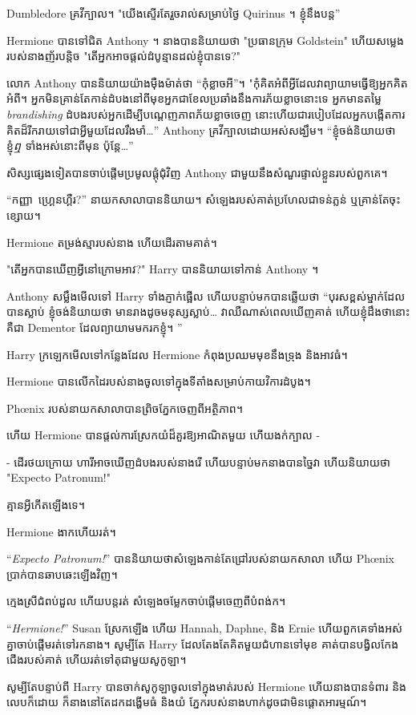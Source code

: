 Dumbledore គ្រវីក្បាល។ "យើងស្ទើរតែរួចរាល់សម្រាប់ថ្ងៃ Quirinus ។ ខ្ញុំនឹងបន្ត”

Hermione បានទៅជិត Anthony ។ នាងបាននិយាយថា "ប្រធានក្រុម Goldstein" ហើយសម្លេងរបស់នាងញ័របន្តិច "តើអ្នកអាចផ្តល់ដំបូន្មានដល់ខ្ញុំបានទេ?"

លោក Anthony បាននិយាយយ៉ាងម៉ឺងម៉ាត់ថា “កុំខ្លាចអី”។ "កុំគិតអំពីអ្វីដែលវាព្យាយាមធ្វើឱ្យអ្នកគិតអំពី។ អ្នកមិនគ្រាន់តែកាន់ដំបងនៅពីមុខអ្នកជាខែលប្រឆាំងនឹងការភ័យខ្លាចនោះទេ អ្នកមានតម្លៃ \emph{brandishing} ដំបងរបស់អ្នកដើម្បីបណ្តេញភាពភ័យខ្លាចចេញ នោះហើយជារបៀបដែលអ្នកបង្កើតការគិតដ៏រីករាយទៅជាអ្វីមួយដែលរឹងមាំ…” Anthony គ្រវីក្បាលដោយអស់សង្ឃឹម។ “ខ្ញុំចង់និយាយថា ខ្ញុំ\emph{ឮ} ទាំងអស់នោះពីមុន ប៉ុន្តែ…”

សិស្សផ្សេងទៀតបានចាប់ផ្តើមប្រមូលផ្តុំជុំវិញ Anthony ជាមួយនឹងសំណួរផ្ទាល់ខ្លួនរបស់ពួកគេ។

“កញ្ញា~ហ្គ្រេនហ្គឺរ?” នាយកសាលាបាននិយាយ។ សំឡេងរបស់គាត់ប្រហែលជាទន់ភ្លន់ ឬគ្រាន់តែចុះខ្សោយ។

Hermione តម្រង់ស្មារបស់នាង ហើយដើរតាមគាត់។

"តើអ្នកបានឃើញអ្វីនៅក្រោមអាវ?" Harry បាននិយាយទៅកាន់ Anthony ។

Anthony សម្លឹងមើលទៅ Harry ទាំងភ្ញាក់ផ្អើល ហើយបន្ទាប់មកបានឆ្លើយថា “បុរសខ្ពស់ម្នាក់ដែលបានស្លាប់ ខ្ញុំចង់និយាយថា មានរាងដូចមនុស្សស្លាប់… វាឈឺណាស់ពេលឃើញគាត់ ហើយខ្ញុំដឹងថានោះគឺជា Dementor ដែលព្យាយាមមករកខ្ញុំ។ ”

Harry ក្រឡេកមើលទៅកន្លែងដែល Hermione កំពុងប្រឈមមុខនឹងទ្រុង និងអាវធំ។

Hermione បានលើកដៃរបស់នាងចូលទៅក្នុងទីតាំងសម្រាប់កាយវិការដំបូង។

Phœnix របស់​នាយក​សាលា​បាន​ព្រិច​ភ្នែក​ចេញ​ពី​អត្ថិភាព។

ហើយ Hermione បានផ្តល់ការស្រែកយំដ៏គួរឱ្យអាណិតមួយ ហើយងក់ក្បាល -

- ដើរថយក្រោយ ហារីអាចឃើញដំបងរបស់នាងរើ ហើយបន្ទាប់មកនាងបានច្នៃវា ហើយនិយាយថា "Expecto Patronum!"

គ្មានអ្វីកើតឡើងទេ។

Hermione ងាកហើយរត់។

“\emph{Expecto Patronum!}” បាននិយាយថាសំឡេងកាន់តែជ្រៅរបស់នាយកសាលា ហើយ Phœnix ប្រាក់បានឆាបឆេះឡើងវិញ។

ក្មេង​ស្រី​ជំពប់​ដួល ហើយ​បន្ត​រត់ សំឡេង​ចម្លែក​ចាប់​ផ្ដើម​ចេញ​ពី​បំពង់ក។

“\emph{Hermione!}” Susan ស្រែកឡើង ហើយ Hannah, Daphne, និង Ernie ហើយពួកគេទាំងអស់គ្នាចាប់ផ្តើមរត់ទៅរកនាង។ សូម្បីតែ Harry ដែលតែងតែគិតមួយជំហានទៅមុខ គាត់បានបង្វិលកែងជើងរបស់គាត់ ហើយរត់ទៅតុជាមួយសូកូឡា។

សូម្បីតែបន្ទាប់ពី Harry បានចាក់សូកូឡាចូលទៅក្នុងមាត់របស់ Hermione ហើយនាងបានទំពារ និងលេបក៏ដោយ ក៏នាងនៅតែដកដង្ហើមធំ និងយំ ភ្នែករបស់នាងហាក់ដូចជាមិនផ្តោតអារម្មណ៍។


